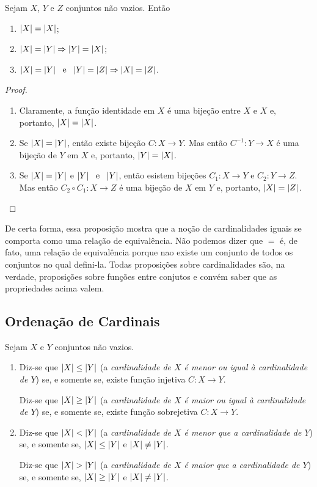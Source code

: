 \begin{prop}\label{conj:prop.card.rel.equiv}
	Sejam $X$, $Y$ e $Z$ conjuntos não vazios. Então
	\begin{enumerate}
	\item $\left\vert{X}\right\vert = \left\vert{X}\right\vert$;
	\item $\left\vert{X}\right\vert = \left\vert{Y}\right\vert \Rightarrow \left\vert{Y}\right\vert = \left\vert{X}\right\vert$;
	\item $\left\vert{X}\right\vert = \left\vert{Y}\right\vert \text{\ \ e\ \ } \left\vert{Y}\right\vert = \left\vert{Z}\right\vert \Rightarrow \left\vert{X}\right\vert = \left\vert{Z}\right\vert$.
	\end{enumerate}
\end{prop}
\begin{proof}
	\begin{enumerate}
	\item Claramente, a função identidade em $X$ é uma bijeção entre $X$ e $X$ e, portanto, $\left\vert{X}\right\vert = \left\vert{X}\right\vert$.
	\item Se $\left\vert{X}\right\vert = \left\vert{Y}\right\vert$, então existe bijeção $C: X \to Y$. Mas então $C^{-1}:Y \to X$ é uma bijeção de $Y$ em $X$ e, portanto, $\left\vert{Y}\right\vert = \left\vert{X}\right\vert$.
	\item Se $\left\vert{X}\right\vert = \left\vert{Y}\right\vert$ e $\left\vert{Y}\right\vert \text{\ \ e\ \ } \left\vert{Y}\right\vert$, então esistem bijeções $C_1: X \to Y$ e $C_2: Y \to Z$. Mas então $C_2 \circ C_1 : X \to Z$ é uma bijeção de $X$ em $Y$ e, portanto, $\left\vert{X}\right\vert = \left\vert{Z}\right\vert$.
	\end{enumerate}
\end{proof}

	De certa forma, essa proposição mostra que a noção de cardinalidades iguais se comporta como uma relação de equivalência. Não podemos dizer que $=$ é, de fato, uma relação de equivalência porque nao existe um conjunto de todos os conjuntos no qual defini-la. Todas proposições sobre cardinalidades são, na verdade, proposições sobre funções entre conjutos e convém saber que as propriedades acima valem.
	
\subsection{Ordenação de Cardinais}

\begin{defi}
	Sejam $X$ e $Y$ conjuntos não vazios.
	\begin{enumerate}
	\item Diz-se que $\left\vert{X}\right\vert \leq \left\vert{Y}\right\vert$ (a \emph{cardinalidade de $X$ é menor ou igual à cardinalidade de $Y$}) se, e somente se, existe função injetiva $C:X \to Y$.
	
	Diz-se que $\left\vert{X}\right\vert \geq \left\vert{Y}\right\vert$ (a \emph{cardinalidade de $X$ é maior ou igual à cardinalidade de $Y$}) se, e somente se, existe função sobrejetiva $C:X \to Y$.
	
	\item Diz-se que $\left\vert{X}\right\vert < \left\vert{Y}\right\vert$ (a \emph{cardinalidade de $X$ é menor que a cardinalidade de $Y$}) se, e somente se, $\left\vert{X}\right\vert \leq \left\vert{Y}\right\vert$ e $\left\vert{X}\right\vert \neq \left\vert{Y}\right\vert$.
	
	Diz-se que $\left\vert{X}\right\vert > \left\vert{Y}\right\vert$ (a \emph{cardinalidade de $X$ é maior que a cardinalidade de $Y$}) se, e somente se, $\left\vert{X}\right\vert \geq \left\vert{Y}\right\vert$ e $\left\vert{X}\right\vert \neq \left\vert{Y}\right\vert$.
	\end{enumerate}
\end{defi}

